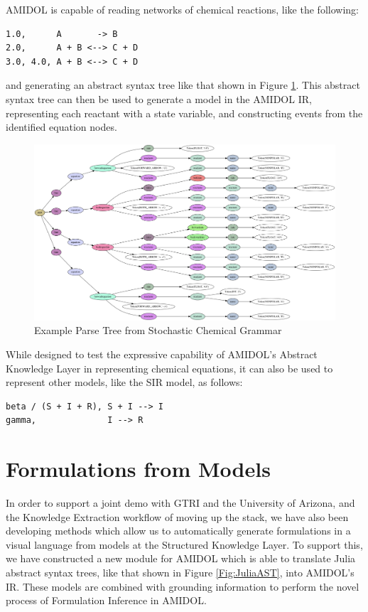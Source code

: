 \documentclass[11pt]{article}
\theoremstyle{definition}
\newcommand{\amidol}{\textsc{AMIDOL}}
\begin{document}
\amidol{} is capable of reading networks of chemical reactions, like
the following:

\begin{lstlisting}[caption=Example Stochastic Chemical Equation]
1.0,      A       -> B
2.0,      A + B <--> C + D
3.0, 4.0, A + B <--> C + D
\end{lstlisting}

and generating an abstract syntax tree like that shown in Figure
\ref{Fig:Reaction}.  This abstract syntax tree can then be used to
generate a model in the \amidol{} IR, representing each reactant with
a state variable, and constructing events from the identified equation
nodes.

\begin{figure}
  \includegraphics[width=\textwidth]{tree.png}
  \caption{Example Parse Tree from Stochastic Chemical Grammar}
  \label{Fig:Reaction}
\end{figure}

While designed to test the expressive capability of \amidol{}'s
Abstract Knowledge Layer in representing chemical equations, it can
also be used to represent other models, like the SIR model, as
follows:

\begin{lstlisting}[caption=Example Stochastic Chemical Equation]
beta / (S + I + R), S + I --> I
gamma,              I --> R
\end{lstlisting}

\section{Formulations from Models}

In order to support a joint demo with GTRI and the University of
Arizona, and the Knowledge Extraction workflow of moving up the stack,
we have also been developing methods which allow
us to automatically generate formulations in a visual language from
models at the Structured Knowledge Layer.  To support this, we have
constructed a new module for \amidol{} which is able to translate
Julia abstract syntax trees, like that shown in Figure \ref{Fig:JuliaAST}, into
\amidol{}'s IR.  These models are combined with grounding information
to perform the novel process of Formulation Inference in \amidol{}.
\end{document}
